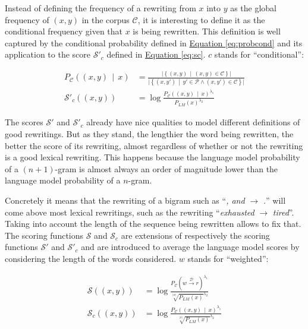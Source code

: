 \documentclass[a4paper, 11pt, onepage]{scrreprt}
\newcommand\equaref[1]{\hyperref[#1]{Equation \ref*{#1}}}
\newcommand\maps[1]{\xrightarrow{\mathcal{#1}}}
\newcommand\card[1]{\lvert #1 \rvert}
\newcommand\suchthat{\, \middle| \,}
\newcommand\given{\, \middle| \,}
\newcommand\proba[2][]{P_{#1} \left( #2 \right)}
\begin{document}
Instead of defining the frequency of a rewriting from $x$ into $y$ as
the global frequency of $(x, y)$ in the corpus $\mathcal{C}$, it is
interesting to define it as the conditional frequency given that $x$
is being rewritten. This definition is well captured by the
conditional probability defined in \equaref{eq:probcond} and its
application to the score $\mathcal{S'}_{c}$ defined in
\equaref{eq:sc}. $c$ stands for “conditional”:

\begin{align}
  \label{eq:probcond}
  \proba[\mathcal{C}]{(x, y) \given x} & = \frac%
  {\card{\left\{(x, y) \suchthat (x, y) \in \mathcal{C}\right\}}}%
  {\card{\left\{(x, y') \suchthat y' \in \mathcal{P} \land (x, y') \in
        \mathcal{C}\right\}}} \\
  \label{eq:sc}
  \mathcal{S'}_{c}((x, y)) & = \log \frac%
  {\proba[\mathcal{C}]{(x, y) \given x}^{\lambda_1}}%
  {\proba[LM]{x}^{\lambda_2}}
\end{align}

The scores $\mathcal{S'}$ and $\mathcal{S'}_c$ already have
nice qualities to model different definitions of good rewritings. But
as they stand, the lengthier the word being rewritten, the better the
score of its rewriting, almost regardless of whether or not the
rewriting is a good lexical rewriting. This happens because the
language model probability of a $(n+1)$-gram is almost always an order
of magnitude lower than the language model probability of a
$n$-gram.

Concretely it means that the rewriting of a bigram such as “\emph{,
  and} $\rightarrow$ \emph{.}”  will come above most lexical
rewritings, such as the rewriting “\emph{exhausted} $\rightarrow$
\emph{tired}”. Taking into account the length of the sequence being
rewritten allows to fix that. The scoring functions $\mathcal{S}$ and
$\mathcal{S}_c$ are extensions of respectively the scoring functions
$\mathcal{S'}$ and $\mathcal{S'}_c$ and are introduced to average the
language model scores by considering the length of the words
considered. $w$ stands for “weighted”:

\begin{align}
  \label{eq:slmw}
  \mathcal{S}((x, y)) & = \log \frac%
  {\proba[\mathcal{C}]{w \maps{D} r}^{\lambda_1}}%
  {\sqrt[\card{w}]{\proba[LM]{x}}^{\lambda_2}} \\
  \label{eq:slmcw}
  \mathcal{S}_{c}((x, y)) & = \log \frac%
  {\proba[\mathcal{C}]{(x, y) \given x}^{\lambda_1}}%
  {\sqrt[\card{x}]{\proba[LM]{x}}^{\lambda_2}}
\end{align}
\end{document}
